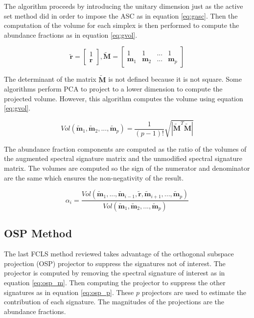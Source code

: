 \documentclass[journal]{IEEEtran}
\begin{document}
The algorithm proceeds by introducing the unitary dimension just as the active set method did in order to impose the ASC as in equation \ref{eq:gasc}. Then the computation of the volume for each simplex is then performed to compute the abundance fractions as in equation \ref{eq:gvol}.

\begin{equation}
\label{eq:gasc}
\mathbf{\tilde{r}} = \begin{bmatrix}
1 \\ \mathbf{r}
\end{bmatrix},
\mathbf{\tilde{M}} =
\begin{bmatrix}
1 & 1 & ... & 1 \\
\mathbf{m}_1 & \mathbf{m}_2 & ... & \mathbf{m}_p
\end{bmatrix}
\end{equation}

The determinant of the matrix \(\mathbf{\tilde{M}}\) is not defined because it is not square. Some algorithms perform PCA to project to a lower dimension to compute the projected volume. However, this algorithm computes the volume using equation \ref{eq:gvol}.

\begin{equation}
\label{eq:gvol}
Vol(\mathbf{\tilde{m}}_1, \mathbf{\tilde{m}}_2, ..., \mathbf{\tilde{m}}_p) = \frac{1}{(p-1)!}\sqrt{|\mathbf{\tilde{M}}^T\mathbf{\tilde{M}}|}
\end{equation}

The abundance fraction components are computed as the ratio of the volumes of the augmented spectral signature matrix and the unmodified spectral signature matrix. The volumes are computed so the sign of the numerator and denominator are the same which ensures the non-negativity of the result.

\begin{equation}
\label{eq:gabundance}
\alpha_i = \frac{Vol(\mathbf{\tilde{m}}_1, ..., \mathbf{\tilde{m}}_{i-1}, \mathbf{\tilde{r}}, \mathbf{\tilde{m}}_{i+1}, ..., \mathbf{\tilde{m}}_p)}{Vol(\mathbf{\tilde{m}}_1, \mathbf{\tilde{m}}_2, ..., \mathbf{\tilde{m}}_p)}
\end{equation}

\subsection{OSP Method}
The last FCLS method reviewed takes advantage of the orthogonal subspace projection (OSP) projector to suppress the signatures not of interest. The projector is computed by removing the spectral signature of interest as in equation \ref{eq:osp_m}. Then computing the projector to suppress the other signatures as in equation \ref{eq:osp_p}. These \(p\) projectors are used to estimate the contribution of each signature. The magnitudes of the projections are the abundance fractions.
\end{document}
